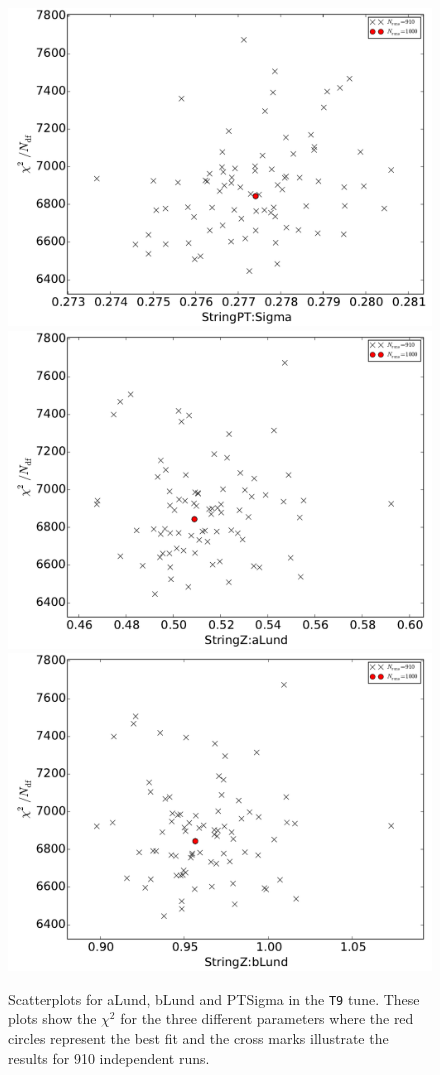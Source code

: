 \documentclass[aps,preprint,floatfix,nofootinbib,showpacs]{revtex4-1}
\begin{document}
\begin{figure}[!h]
 \centering
 \includegraphics[width=0.35\linewidth]{Figures/RS/Set-L3/chi2_StringPT_Sigma.pdf}
 \hfill
 \includegraphics[width=0.35\linewidth]{Figures/RS/Set-L3/chi2_StringZ_aLund.pdf}
 \hfill
 \includegraphics[width=0.35\linewidth]{Figures/RS/Set-L3/chi2_StringZ_bLund.pdf}
 \caption{Scatterplots for \textsf{aLund}, \textsf{bLund} and \textsf{PTSigma} in
 the \texttt{T9} tune. These plots show the $\chi^2$ for the three different 
 parameters where the red circles represent the best fit and the cross marks illustrate 
 the results for 910 independent runs.}
 \label{RS.3}
\end{figure}
\clearpage
\end{document}
